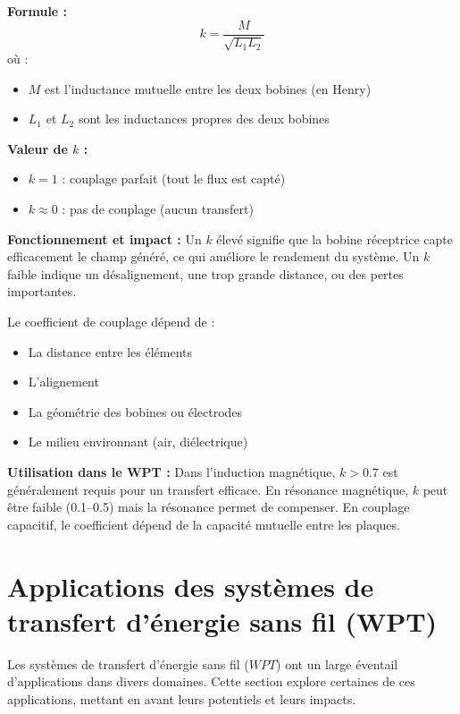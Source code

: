 \documentclass[12pt,a4paper,titlepage,notitlepage]{article}
\begin{document}
	\textbf{Formule :}
	\[
	k = \frac{M}{\sqrt{L_1 L_2}}
	\]
	où :
	\begin{itemize}
		\item \(M\) est l’inductance mutuelle entre les deux bobines (en Henry)
		\item \(L_1\) et \(L_2\) sont les inductances propres des deux bobines
	\end{itemize}
	
	\textbf{Valeur de \(k\) :}
	\begin{itemize}
		\item \(k = 1\) : couplage parfait (tout le flux est capté)
		\item \(k \approx 0\) : pas de couplage (aucun transfert)
	\end{itemize}
	
	\textbf{Fonctionnement et impact :} Un \(k\) élevé signifie que la bobine réceptrice capte efficacement le champ généré, ce qui améliore le rendement du système. Un \(k\) faible indique un désalignement, une trop grande distance, ou des pertes importantes.
	
	Le coefficient de couplage dépend de :
	\begin{itemize}
		\item La distance entre les éléments
		\item L’alignement
		\item La géométrie des bobines ou électrodes
		\item Le milieu environnant (air, diélectrique)
	\end{itemize}
	
	\textbf{Utilisation dans le WPT :} Dans l’induction magnétique, \(k > 0.7\) est généralement requis pour un transfert efficace. En résonance magnétique, \(k\) peut être faible (0.1–0.5) mais la résonance permet de compenser. En couplage capacitif, le coefficient dépend de la capacité mutuelle entre les plaques.
	
	
	
	
	
	
	
	
	
	\section{Applications des systèmes de transfert d'énergie sans fil (WPT)}
	
	Les systèmes de transfert d'énergie sans fil ($WPT$) ont un large éventail d'applications dans divers domaines. Cette section explore certaines de ces applications, mettant en avant leurs potentiels et leurs impacts.
	
\end{document}
